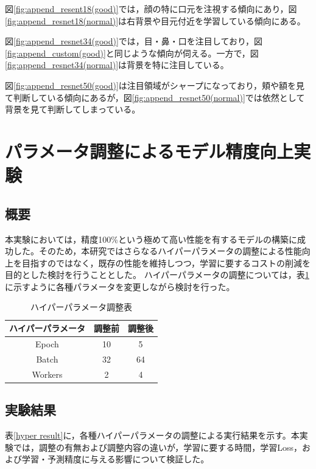 \documentclass[a4paper,11pt,titlepage]{jsarticle}
\begin{document}
図\ref{fig:append_resent18(good)}では，顔の特に口元を注視する傾向にあり，図\ref{fig:append_resnet18(normal)}は右背景や目元付近を学習している傾向にある。\par
図\ref{fig:append_resnet34(good)}では，目・鼻・口を注目しており，図\ref{fig:append_custom(good)}と同じような傾向が伺える。一方で，図\ref{fig:append_resnet34(normal)}は背景を特に注目している。\par

図\ref{fig:append_resnet50(good)}は注目領域がシャープになっており，頬や額を見て判断している傾向にあるが，図\ref{fig:append_resnet50(normal)}では依然として背景を見て判断してしまっている。


\section{パラメータ調整によるモデル精度向上実験}
\subsection{概要}
本実験においては，精度100\%という極めて高い性能を有するモデルの構築に成功した。そのため，本研究ではさらなるハイパーパラメータの調整による性能向上を目指すのではなく，既存の性能を維持しつつ，学習に要するコストの削減を目的とした検討を行うこととした。
ハイパーパラメータの調整については，表\ref{hyper table}に示すように各種パラメータを変更しながら検討を行った。
\begin{table}[httb]
\centering
\caption{ハイパーパラメータ調整表}
\label{hyper table}
\begin{tabular}{|c|c|c|}
\hline
ハイパーパラメータ& 調整前& 調整後 \\
\hline
Epoch&10&5 \\
\hline
Batch&32&64 \\
\hline
Workers&2&4 \\
\hline
\end{tabular}
\end{table}

\subsection{実験結果}

表\ref{hyper result}に，各種ハイパーパラメータの調整による実行結果を示す。本実験では，調整の有無および調整内容の違いが，学習に要する時間，学習Loss，および学習・予測精度に与える影響について検証した。
\end{document}
